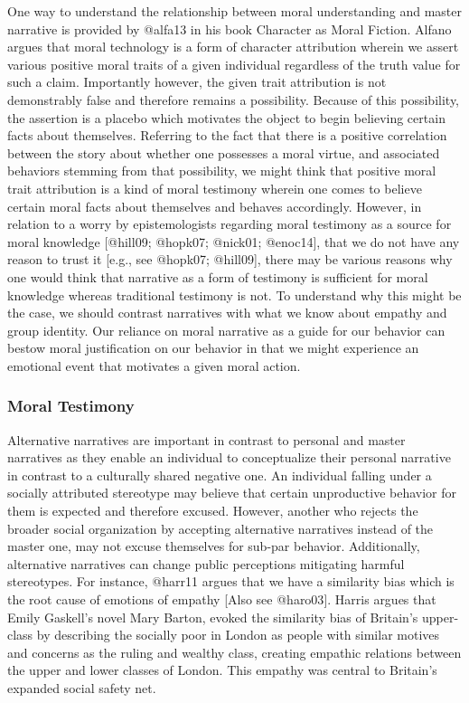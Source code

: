 \documentclass[
  letterpaper,
  DIV=11,
  numbers=noendperiod]{scrartcl}
\theoremstyle{remark}
\begin{document}
One way to understand the relationship between moral understanding and
master narrative is provided by @alfa13 in his book Character as Moral
Fiction. Alfano argues that moral technology is a form of character
attribution wherein we assert various positive moral traits of a given
individual regardless of the truth value for such a claim. Importantly
however, the given trait attribution is not demonstrably false and
therefore remains a possibility. Because of this possibility, the
assertion is a placebo which motivates the object to begin believing
certain facts about themselves. Referring to the fact that there is a
positive correlation between the story about whether one possesses a
moral virtue, and associated behaviors stemming from that possibility,
we might think that positive moral trait attribution is a kind of moral
testimony wherein one comes to believe certain moral facts about
themselves and behaves accordingly. However, in relation to a worry by
epistemologists regarding moral testimony as a source for moral
knowledge {[}@hill09; @hopk07; @nick01; @enoc14{]}, that we do not have
any reason to trust it {[}e.g., see @hopk07; @hill09{]}, there may be
various reasons why one would think that narrative as a form of
testimony is sufficient for moral knowledge whereas traditional
testimony is not. To understand why this might be the case, we should
contrast narratives with what we know about empathy and group identity.
Our reliance on moral narrative as a guide for our behavior can bestow
moral justification on our behavior in that we might experience an
emotional event that motivates a given moral action.

\subsubsection{Moral Testimony}\label{moral-testimony}

Alternative narratives are important in contrast to personal and master
narratives as they enable an individual to conceptualize their personal
narrative in contrast to a culturally shared negative one. An individual
falling under a socially attributed stereotype may believe that certain
unproductive behavior for them is expected and therefore excused.
However, another who rejects the broader social organization by
accepting alternative narratives instead of the master one, may not
excuse themselves for sub-par behavior. Additionally, alternative
narratives can change public perceptions mitigating harmful stereotypes.
For instance, @harr11 argues that we have a similarity bias which is the
root cause of emotions of empathy {[}Also see @haro03{]}. Harris argues
that Emily Gaskell's novel Mary Barton, evoked the similarity bias of
Britain's upper-class by describing the socially poor in London as
people with similar motives and concerns as the ruling and wealthy
class, creating empathic relations between the upper and lower classes
of London. This empathy was central to Britain's expanded social safety
net.
\end{document}
